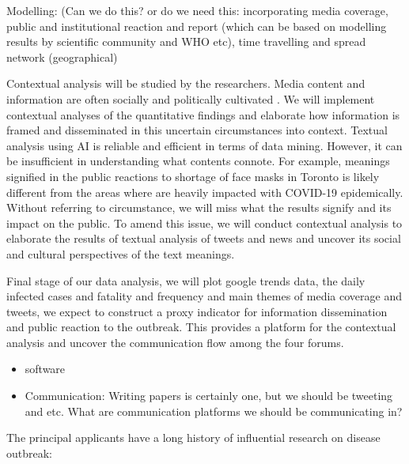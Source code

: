 

Modelling: (Can we do this? or do we need this: incorporating media coverage, public and institutional reaction and report (which can be based on modelling results by scientific community and WHO etc), time travelling and spread network (geographical)

Contextual analysis will be studied by the researchers.  Media content and information are often socially and politically cultivated \cite{}.  We will implement contextual analyses of the quantitative findings and elaborate how information is framed and disseminated in this uncertain circumstances into context.  Textual analysis using AI is reliable and efficient in terms of data mining.  However, it can be insufficient in understanding what contents connote.  For example, meanings signified in the public reactions to shortage of face masks in Toronto is likely different from  the areas where are heavily impacted with COVID-19 epidemically.  Without referring to circumstance, we will miss what the results signify and its impact on the public.  To amend this issue, we will conduct contextual analysis \citep{} to elaborate the results of textual analysis of tweets and news and uncover its social and cultural perspectives of the text meanings.

Final stage of our data analysis,  we will plot google trends data, the daily infected cases and fatality and frequency and main themes of media coverage and tweets,  we expect to construct a proxy indicator for information dissemination and public reaction to the outbreak.  This provides a platform for the contextual analysis and uncover the communication flow among the four forums.


\begin{itemize}
\item{software}
\item{Communication: Writing papers is certainly one, but we should be tweeting and etc. What are communication platforms we should be communicating in?}
\end{itemize}


The principal applicants have a long history of influential research on disease outbreak: 

